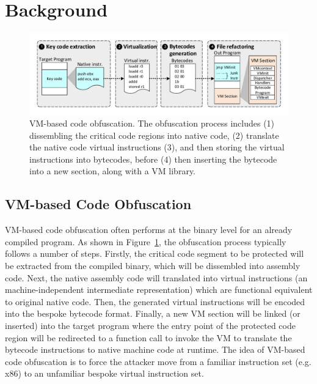 \section{Background}\label{sec:bak}

\begin{figure}[t]%
    \centering
    \includegraphics[width=1\columnwidth]{figure/figvmp.pdf}
    \caption{VM-based code obfuscation. The obfuscation process includes (1) dissembling the critical code regions into native code, (2) translate the native code virtual instructions (3), and then storing the virtual instructions into bytecodes, before (4) then inserting the bytecode into a new section, along with a VM library.}\label{fig:Fig.vmp}
\end{figure}

\subsection{VM-based Code Obfuscation}
VM-based code obfuscation often performs at the binary level for an already
compiled program. As shown in Figure~\ref{fig:Fig.vmp}, the obfuscation
process typically follows a number of steps. Firstly, the critical code
segment to be protected will be extracted from the compiled binary, which
will be dissembled into assembly code. Next, the native assembly code will
translated into virtual instructions (an machine-independent intermediate
representation) which are functional equivalent to original native code.
Then, the generated virtual instructions will be encoded into the bespoke
bytecode format.  Finally, a new VM section will be linked (or inserted) into
the target program where the entry point of the protected code region will be
redirected to a function call to invoke the VM to translate the bytecode
instructions to native machine code at runtime. The idea of VM-based code
obfuscation is to force the attacker move from a familiar
instruction set (e.g. x86) to an unfamiliar bespoke virtual instruction set.


